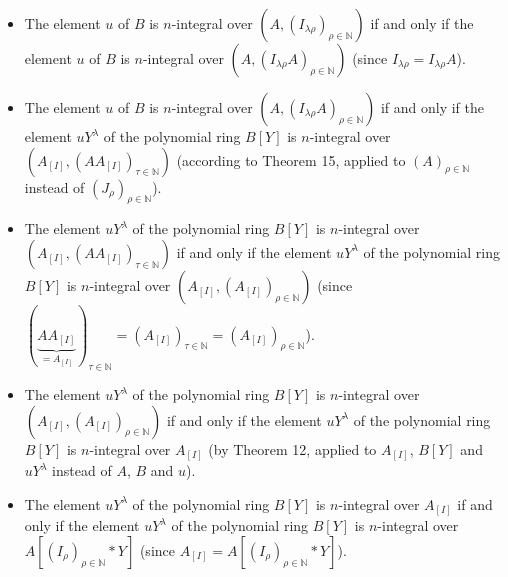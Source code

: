 \documentclass[12pt,final,notitlepage,onecolumn]{article}%
\begin{document}
\begin{itemize}
\item The element $u$ of $B$ is $n$-integral over $\left(  A,\left(
I_{\lambda\rho}\right)  _{\rho\in\mathbb{N}}\right)  $ if and only if the
element $u$ of $B$ is $n$-integral over $\left(  A,\left(  I_{\lambda\rho
}A\right)  _{\rho\in\mathbb{N}}\right)  $ (since $I_{\lambda\rho}%
=I_{\lambda\rho}A$).

\item The element $u$ of $B$ is $n$-integral over $\left(  A,\left(
I_{\lambda\rho}A\right)  _{\rho\in\mathbb{N}}\right)  $ if and only if the
element $uY^{\lambda}$ of the polynomial ring $B\left[  Y\right]  $ is
$n$-integral over $\left(  A_{\left[  I\right]  },\left(  AA_{\left[
I\right]  }\right)  _{\tau\in\mathbb{N}}\right)  $ (according to Theorem 15,
applied to $\left(  A\right)  _{\rho\in\mathbb{N}}$ instead of $\left(
J_{\rho}\right)  _{\rho\in\mathbb{N}}$).

\item The element $uY^{\lambda}$ of the polynomial ring $B\left[  Y\right]  $
is $n$-integral over $\left(  A_{\left[  I\right]  },\left(  AA_{\left[
I\right]  }\right)  _{\tau\in\mathbb{N}}\right)  $ if and only if the element
$uY^{\lambda}$ of the polynomial ring $B\left[  Y\right]  $ is $n$-integral
over $\left(  A_{\left[  I\right]  },\left(  A_{\left[  I\right]  }\right)
_{\rho\in\mathbb{N}}\right)  $ (since $\left(  \underbrace{AA_{\left[
I\right]  }}_{=A_{\left[  I\right]  }}\right)  _{\tau\in\mathbb{N}}=\left(
A_{\left[  I\right]  }\right)  _{\tau\in\mathbb{N}}=\left(  A_{\left[
I\right]  }\right)  _{\rho\in\mathbb{N}}$).

\item The element $uY^{\lambda}$ of the polynomial ring $B\left[  Y\right]  $
is $n$-integral over $\left(  A_{\left[  I\right]  },\left(  A_{\left[
I\right]  }\right)  _{\rho\in\mathbb{N}}\right)  $ if and only if the element
$uY^{\lambda}$ of the polynomial ring $B\left[  Y\right]  $ is $n$-integral
over $A_{\left[  I\right]  }$ (by Theorem 12, applied to $A_{\left[  I\right]
}$, $B\left[  Y\right]  $ and $uY^{\lambda}$ instead of $A$, $B$ and $u$).

\item The element $uY^{\lambda}$ of the polynomial ring $B\left[  Y\right]  $
is $n$-integral over $A_{\left[  I\right]  }$ if and only if the element
$uY^{\lambda}$ of the polynomial ring $B\left[  Y\right]  $ is $n$-integral
over $A\left[  \left(  I_{\rho}\right)  _{\rho\in\mathbb{N}}\ast Y\right]  $
(since $A_{\left[  I\right]  }=A\left[  \left(  I_{\rho}\right)  _{\rho
\in\mathbb{N}}\ast Y\right]  $).
\end{itemize}
\end{document}
